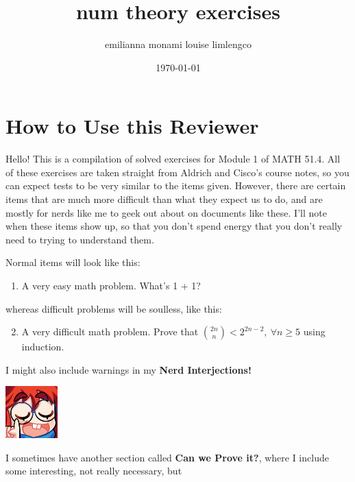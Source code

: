 \documentclass{article}
\title{num theory exercises}
\author{emilianna monami louise limlengco}
\date{\today}
\renewcommand{\labelenumi}{\colorbox{pink}{\textbf{\arabic{enumi}}}}
\begin{document}
 

\section*{How to Use this Reviewer}
Hello! This is a compilation of solved exercises for Module 1 of MATH 51.4. All of these exercises are taken straight from Aldrich and Cisco's course notes, so you can expect tests 
to be very similar to the items given. However, there are certain items that are much more difficult than what they expect us to do, and are mostly for nerds like me to geek out about 
on documents like these. I'll note when these items show up, so that you don't spend energy that you don't really need to trying to understand them.\par Normal items will look like this:\begin{enumerate} 
    \item A very easy math problem. What's 1 + 1?
\end{enumerate} 
whereas difficult problems will be soulless, like this:\begin{enumerate}\setcounter{enumi}{1}
    \renewcommand{\labelenumi}{\fcolorbox{magenta}{white}{\textbf{\arabic{enumi}}}}
    \item A very difficult math problem. Prove that $\displaystyle \binom{2n}{n} < 2^{2n-2},~\forall n \geq 5$ using induction. 
\end{enumerate} I might also include warnings in my \textbf{Nerd Interjections!}\par
\parindent=25pt \begin{minipage}[t]{.14\textwidth}
    \vspace{0pt}
    \includegraphics[width=2cm]{nerd_maddy.png} 
\end{minipage}%
\parindent=0pt \par I sometimes have another section called \textbf{Can we Prove it?}, where I include some interesting, not really necessary, but 
\end{document}

